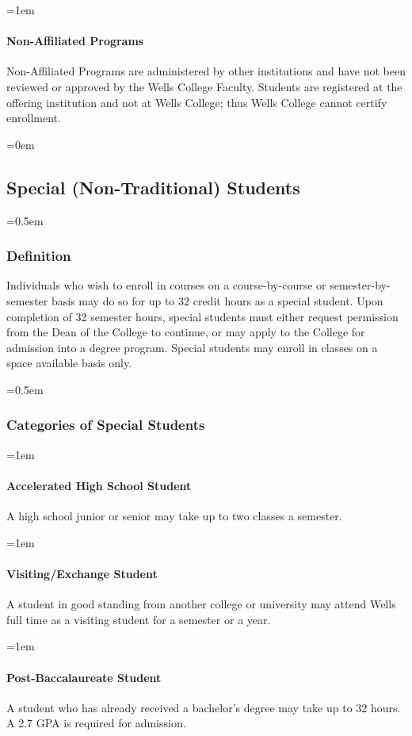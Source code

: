 \documentclass{manual}
\let\oldsubsection\subsection
\renewcommand\subsection{\leftskip=0em\oldsubsection}
\let\oldsubsubsection\subsubsection
\renewcommand\subsubsection{\leftskip=0.5em\oldsubsubsection}
\let\oldparagraph\paragraph
\renewcommand\paragraph{\leftskip=1em\oldparagraph}
\begin{document}
\paragraph{Non-Affiliated Programs}
Non-Affiliated Programs are administered by other institutions and have not been reviewed or approved by the Wells College Faculty. Students are registered at the offering institution and not at Wells College; thus Wells College cannot certify enrollment. 

\subsection{Special (Non-Traditional) Students}\label{sec:NonTraditionalStudents}

\subsubsection{Definition}

Individuals who wish to enroll in courses on a course-by-course or semester-by-semester basis may do so for up to 32 credit hours as a special student. Upon completion of 32 semester hours, special students must either request permission from the Dean of the College to continue, or may apply to the College for admission into a degree program. Special students may enroll in classes on a space available basis only.

\subsubsection{Categories of Special Students}\label{sub:CategoriesOfSpecialStudents}

\paragraph{Accelerated High School Student} A high school junior or senior may take up to two classes a semester.

\paragraph{Visiting/Exchange Student} A student in good standing from another college or university may attend Wells full time as a visiting student for a semester or a year.

\paragraph{Post-Baccalaureate Student} A student who has already received a bachelor's degree may take up to 32 hours. A 2.7 GPA is required for admission. 
\end{document}
